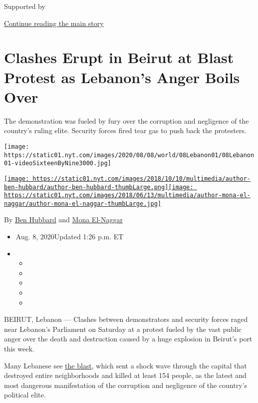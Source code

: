 Supported by

\protect\hyperlink{after-sponsor}{Continue reading the main story}

\hypertarget{clashes-erupt-in-beirut-at-blast-protest-as-lebanons-anger-boils-over}{%
\section{Clashes Erupt in Beirut at Blast Protest as Lebanon's Anger
Boils
Over}\label{clashes-erupt-in-beirut-at-blast-protest-as-lebanons-anger-boils-over}}

The demonstration was fueled by fury over the corruption and negligence
of the country's ruling elite. Security forces fired tear gas to push
back the protesters.

\texttt{[image: https://static01.nyt.com/images/2020/08/08/world/08Lebanon01/08Lebanon01-videoSixteenByNine3000.jpg]}

\href{https://www.nytimes.com/by/ben-hubbard}{\texttt{[image: https://static01.nyt.com/images/2018/10/10/multimedia/author-ben-hubbard/author-ben-hubbard-thumbLarge.png]}}\href{https://www.nytimes.com/by/mona-el-naggar}{\texttt{[image: https://static01.nyt.com/images/2018/06/13/multimedia/author-mona-el-naggar/author-mona-el-naggar-thumbLarge.jpg]}}

By \href{https://www.nytimes.com/by/ben-hubbard}{Ben Hubbard} and
\href{https://www.nytimes.com/by/mona-el-naggar}{Mona El-Naggar}

\begin{itemize}
\item
  Aug. 8, 2020Updated 1:26 p.m. ET
\item
  \begin{itemize}
  \item
  \item
  \item
  \item
  \item
  \end{itemize}
\end{itemize}

BEIRUT, Lebanon --- Clashes between demonstrators and security forces
raged near Lebanon's Parliament on Saturday at a protest fueled by the
vast public anger over the death and destruction caused by a huge
explosion in Beirut's port this week.

Many Lebanese see
\href{https://www.nytimes.com/2020/08/04/world/middleeast/lebanon-explosion.html}{the
blast}, which sent a shock wave through the capital that destroyed
entire neighborhoods and killed at least 154 people, as the latest and
most dangerous manifestation of the corruption and negligence of the
country's political elite.


